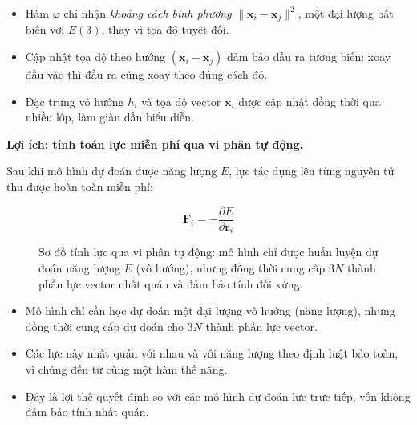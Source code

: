 \begin{itemize}
    \item Hàm $\varphi$ chỉ nhận \textit{khoảng cách bình phương} $\|\mathbf{x}_i - \mathbf{x}_j\|^2$, một đại lượng bất biến với $E(3)$, thay vì tọa độ tuyệt đối.
    \item Cập nhật tọa độ theo hướng $(\mathbf{x}_i - \mathbf{x}_j)$ đảm bảo đầu ra tương biến: xoay đầu vào thì đầu ra cũng xoay theo đúng cách đó.
    \item Đặc trưng vô hướng $h_i$ và tọa độ vector $\mathbf{x}_i$ được cập nhật đồng thời qua nhiều lớp, làm giàu dần biểu diễn.
\end{itemize}

\textbf{Lợi ích: tính toán lực miễn phí qua vi phân tự động.}

Sau khi mô hình dự đoán được năng lượng $E$, lực tác dụng lên từng nguyên tử thu được hoàn toàn miễn phí:

\begin{equation}
    \mathbf{F}_i = -\frac{\partial E}{\partial \mathbf{r}_i}
    \label{eq:force-autograd}
\end{equation}

\begin{figure}[H]
\centering
{}
\caption{Sơ đồ tính lực qua vi phân tự động: mô hình chỉ được huấn luyện dự đoán năng lượng $E$ (vô hướng), nhưng đồng thời cung cấp $3N$ thành phần lực vector nhất quán và đảm bảo tính đối xứng.}
\label{fig:force-autograd}
\end{figure}

\begin{itemize}
    \item Mô hình chỉ cần học dự đoán một đại lượng vô hướng (năng lượng), nhưng đồng thời cung cấp dự đoán cho $3N$ thành phần lực vector.
    \item Các lực này nhất quán với nhau và với năng lượng theo định luật bảo toàn, vì chúng đến từ cùng một hàm thế năng.
    \item Đây là lợi thế quyết định so với các mô hình dự đoán lực trực tiếp, vốn không đảm bảo tính nhất quán.
\end{itemize}

